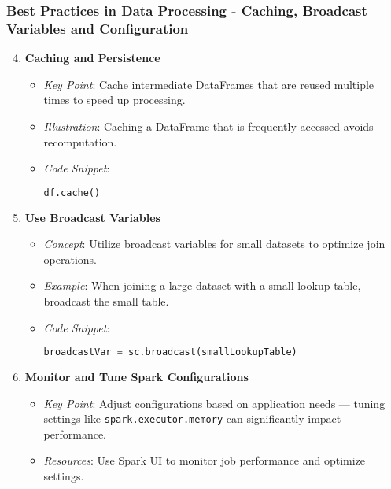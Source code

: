 \documentclass[aspectratio=169]{beamer}
\begin{document}
\begin{frame}[fragile]
    \frametitle{Best Practices in Data Processing - Caching, Broadcast Variables and Configuration}
    \begin{enumerate}
        \setcounter{enumi}{3}
        \item \textbf{Caching and Persistence}
        \begin{itemize}
            \item \textit{Key Point}: Cache intermediate DataFrames that are reused multiple times to speed up processing.
            \item \textit{Illustration}: Caching a DataFrame that is frequently accessed avoids recomputation.
            \item \textit{Code Snippet}:
            \begin{lstlisting}[language=python]
            df.cache()
            \end{lstlisting}
        \end{itemize}

        \item \textbf{Use Broadcast Variables}
        \begin{itemize}
            \item \textit{Concept}: Utilize broadcast variables for small datasets to optimize join operations.
            \item \textit{Example}: When joining a large dataset with a small lookup table, broadcast the small table.
            \item \textit{Code Snippet}:
            \begin{lstlisting}[language=python]
            broadcastVar = sc.broadcast(smallLookupTable)
            \end{lstlisting}
        \end{itemize}
        
        \item \textbf{Monitor and Tune Spark Configurations}
        \begin{itemize}
            \item \textit{Key Point}: Adjust configurations based on application needs — tuning settings like \texttt{spark.executor.memory} can significantly impact performance.
            \item \textit{Resources}: Use Spark UI to monitor job performance and optimize settings.
        \end{itemize}
    \end{enumerate}
\end{frame}
\end{document}
